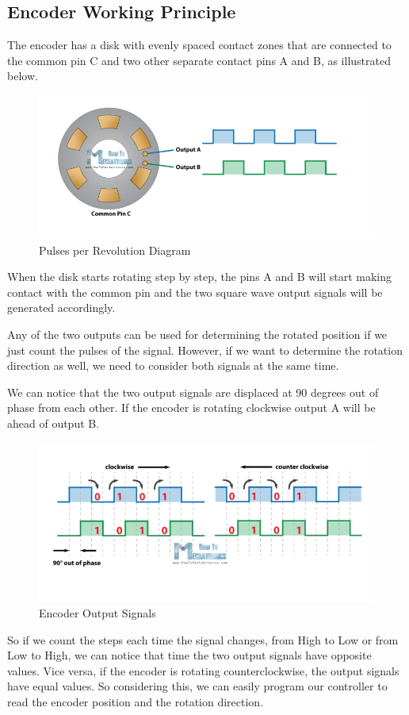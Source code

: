 \subsection{Encoder Working Principle}

The encoder has a disk with evenly spaced contact zones that are connected to the common pin C and two other separate contact pins A and B, as illustrated below.
\begin{figure}[h!]
     \centering
         \centering
         \includegraphics[scale=0.5]{./Figures/AppendixB/encoder.png}
         \caption{Pulses per Revolution Diagram}
         \label{fig: Pulses per Revolution Diagram}
\end{figure}
When the disk starts rotating step by step, the pins A and B will start making contact with the common pin and the two square wave output signals will be generated accordingly.

Any of the two outputs can be used for determining the rotated position if we just count the pulses of the signal. However, if we want to determine the rotation direction as well, we need to consider both signals at the same time.

We can notice that the two output signals are displaced at 90 degrees out of phase from each other. If the encoder is rotating clockwise output A will be ahead of output B. 
\begin{figure}[h!]
     \centering
         \centering
         \includegraphics[scale=0.5]{./Figures/AppendixB/encoder-pulses.png}
         \caption{Encoder Output Signals}
         \label{fig: Encoder Output Signals}
\end{figure}
So if we count the steps each time the signal changes, from High to Low or from Low to High, we can notice that time the two output signals have opposite values. Vice versa, if the encoder is rotating counterclockwise, the output signals have equal values. So considering this, we can easily program our controller to read the encoder position and the rotation direction.





